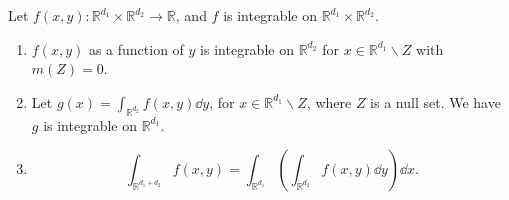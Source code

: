 \begin{theorem}
    Let $f(x,y): \mathbb{R}^{d_1}\times \mathbb{R}^{d_2}\to \mathbb{R}$, and $f$ is
	integrable on $\mathbb{R}^{d_1}\times \mathbb{R}^{d_2}$.
	\begin{enumerate}%
		\item $f(x, y)$ as a function of  $y$ is integrable on  $\mathbb{R}^{d_2}$
			for $x\in \mathbb{R}^{d_1}\backslash Z$ with $m(Z) = 0$.
		\item Let  $g(x) = \int_{\mathbb{R}^{d_2}}f(x, y)\dd y$,
			for $x\in \mathbb{R}^{d_1}\backslash Z$, where $Z$ is a null set.
			We have $g$ is integrable on  $\mathbb{R}^{d_1}$.
		\item
			\[
			\int_{\mathbb{R}^{d_1+d_2}} f(x,y) = \int_{\mathbb{R}^{d_1}}
			\left( \int_{\mathbb{R}^{d_2}} f(x, y)\dd y \right)\dd x.
			\]
	\end{enumerate}
\end{theorem}

